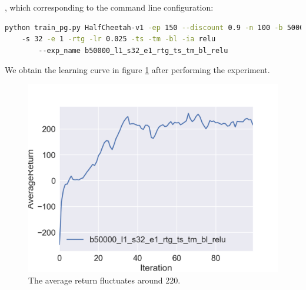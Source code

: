 \documentclass[a4paper]{article}
\theoremstyle{definition}
\begin{document}
, which corresponding to the command line configuration:
\begin{lstlisting}[language=bash]
python train_pg.py HalfCheetah-v1 -ep 150 --discount 0.9 -n 100 -b 50000 -l 1 
	-s 32 -e 1 -rtg -lr 0.025 -ts -tm -bl -ia relu 
    	--exp_name b50000_l1_s32_e1_rtg_ts_tm_bl_relu
\end{lstlisting}

We obtain the learning curve in figure \ref{fig:HalfCheetah} after performing the experiment.

\begin{figure}[H]
\centering
\includegraphics[width=0.4\linewidth]{figures/HalfCheetah.png}
\caption{The average return fluctuates around 220.}
\label{fig:HalfCheetah}
\end{figure}
\end{document}
